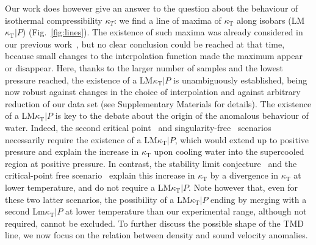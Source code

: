 \documentclass[12pt]{article}
\newcommand{\mrm}{\mathrm}
\newcommand{\kT}{\kappa_\mrm{T}}
\begin{document}
Our work does however give an answer to the question about the behaviour of isothermal compressibility $\kappa_T$: we find a line of maxima of $\kT$ along isobars (LM$\kT |P$) (Fig.~\ref{fig:lines}). The existence of such maxima was already considered in our previous work~\cite{Pallares_equation_2016}, but no clear conclusion could be reached at that time, because small changes to the interpolation function made the maximum appear or disappear. Here, thanks to the larger number of samples and the lowest pressure reached, the existence of a LM$\kT |P$ is unambiguously established, being now robust against changes in the choice of interpolation and against arbitrary reduction of our data set (see Supplementary Materials for details). The existence of a LM$\kT |P$ is key to the debate about the origin of the anomalous behaviour of water. Indeed, the second critical point~\cite{Poole_phase_1992} and singularity-free~\cite{Sastry_singularityfree_1996} scenarios necessarily require the existence of a LM$\kT |P$, which would extend up to positive pressure and explain the increase in $\kT$ upon cooling water into the supercooled region at positive pressure. In contrast, the stability limit conjecture~\cite{Speedy_stabilitylimit_1982} and the critical-point free scenario~\cite{Angell_insights_2008} explain this increase in $\kT$ by a divergence in $\kT$ at lower temperature, and do not require a LM$\kT |P$. Note however that, even for these two latter scenarios, the possibility of a LM$\kT |P$ ending by merging with a second Lm$\kT |P$ at lower temperature than our experimental range, although not required, cannot be excluded. To further discuss the possible shape of the TMD line, we now focus on the relation between density and sound velocity anomalies.


\end{document}
